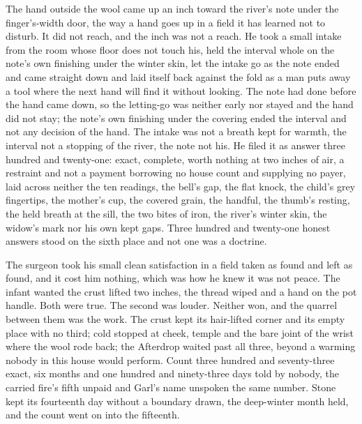 The hand outside the wool came up an inch toward the river's note under the finger's-width door, the way a hand goes up in a field it has learned not to disturb. It did not reach, and the inch was not a reach. He took a small intake from the room whose floor does not touch his, held the interval whole on the note's own finishing under the winter skin, let the intake go as the note ended and came straight down and laid itself back against the fold as a man puts away a tool where the next hand will find it without looking. The note had done before the hand came down, so the letting-go was neither early nor stayed and the hand did not stay; the note's own finishing under the covering ended the interval and not any decision of the hand. The intake was not a breath kept for warmth, the interval not a stopping of the river, the note not his. He filed it as answer three hundred and twenty-one: exact, complete, worth nothing at two inches of air, a restraint and not a payment borrowing no house count and supplying no payer, laid across neither the ten readings, the bell's gap, the flat knock, the child's grey fingertips, the mother's cup, the covered grain, the handful, the thumb's resting, the held breath at the sill, the two bites of iron, the river's winter skin, the widow's mark nor his own kept gaps. Three hundred and twenty-one honest answers stood on the sixth place and not one was a doctrine.

The surgeon took his small clean satisfaction in a field taken as found and left as found, and it cost him nothing, which was how he knew it was not peace. The infant wanted the crust lifted two inches, the thread wiped and a hand on the pot handle. Both were true. The second was louder. Neither won, and the quarrel between them was the work. The crust kept its hair-lifted corner and its empty place with no third; cold stopped at cheek, temple and the bare joint of the wrist where the wool rode back; the Afterdrop waited past all three, beyond a warming nobody in this house would perform. Count three hundred and seventy-three exact, six months and one hundred and ninety-three days told by nobody, the carried fire's fifth unpaid and Garl's name unspoken the same number. Stone kept its fourteenth day without a boundary drawn, the deep-winter month held, and the count went on into the fifteenth.
